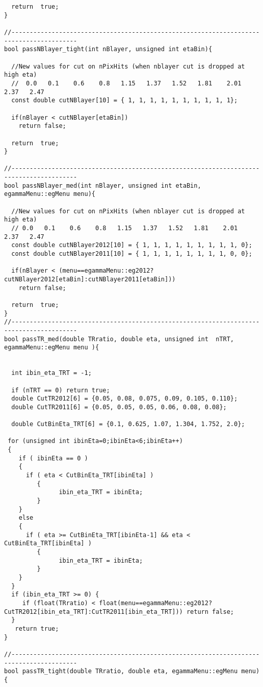 \begin{lstlisting}
  return  true;
}

//----------------------------------------------------------------------------------------
bool passNBlayer_tight(int nBlayer, unsigned int etaBin){
  
  //New values for cut on nPixHits (when nblayer cut is dropped at high eta)
  //  0.0   0.1    0.6    0.8   1.15   1.37   1.52   1.81    2.01   2.37   2.47
  const double cutNBlayer[10] = { 1, 1, 1, 1, 1, 1, 1, 1, 1, 1};   
				    
  if(nBlayer < cutNBlayer[etaBin])
    return false;
    
  return  true;
}

//----------------------------------------------------------------------------------------
bool passNBlayer_med(int nBlayer, unsigned int etaBin, egammaMenu::egMenu menu){
  
  //New values for cut on nPixHits (when nblayer cut is dropped at high eta)
  // 0.0   0.1    0.6    0.8   1.15   1.37   1.52   1.81    2.01   2.37   2.47
  const double cutNBlayer2012[10] = { 1, 1, 1, 1, 1, 1, 1, 1, 1, 0};   
  const double cutNBlayer2011[10] = { 1, 1, 1, 1, 1, 1, 1, 1, 0, 0};   
				    
  if(nBlayer < (menu==egammaMenu::eg2012?cutNBlayer2012[etaBin]:cutNBlayer2011[etaBin]))
    return false;
    
  return  true;
}
//----------------------------------------------------------------------------------------
bool passTR_med(double TRratio, double eta, unsigned int  nTRT, egammaMenu::egMenu menu ){

 
  int ibin_eta_TRT = -1;
  
  if (nTRT == 0) return true; 
  double CutTR2012[6] = {0.05, 0.08, 0.075, 0.09, 0.105, 0.110};
  double CutTR2011[6] = {0.05, 0.05, 0.05, 0.06, 0.08, 0.08};
  
  double CutBinEta_TRT[6] = {0.1, 0.625, 1.07, 1.304, 1.752, 2.0};

 for (unsigned int ibinEta=0;ibinEta<6;ibinEta++) 
 {
    if ( ibinEta == 0 )
    {
      if ( eta < CutBinEta_TRT[ibinEta] ) 
         {
	           ibin_eta_TRT = ibinEta;
         }
    } 
    else 
    {
      if ( eta >= CutBinEta_TRT[ibinEta-1] && eta < CutBinEta_TRT[ibinEta] ) 
         {
	           ibin_eta_TRT = ibinEta;
         }
    }
  }
  if (ibin_eta_TRT >= 0) {
     if (float(TRratio) < float(menu==egammaMenu::eg2012?CutTR2012[ibin_eta_TRT]:CutTR2011[ibin_eta_TRT])) return false; 
  } 
   return true;
}

//----------------------------------------------------------------------------------------
bool passTR_tight(double TRratio, double eta, egammaMenu::egMenu menu){


\end{lstlisting}
